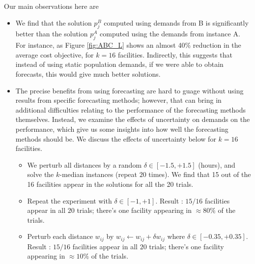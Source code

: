 \noindent
Our main observations here are
\begin{itemize}
\item
We find that the solution $p^B_j$ computed using demands from B is significantly better than the
solution $p^A_j$ computed using the demands from instance A. For instance, as Figure \ref{fig:ABC_L}
shows an almost 40\% reduction in the average cost objective, for $k=16$ facilities.
Indirectly, this suggests that instead of using static population demands, if we were able to obtain 
forecasts, this would give much better solutions.
\item
The precise benefits from using forecasting are hard to guage without using results from specific
forecasting methods; however, that can bring in additional difficulties relating to the performance of the
forecasting methods themselves. Instead, we examine the effects of uncertainty on demands on the
performance, which give us some insights into how well the forecasting methods should be.
We discuss the effects of uncertainty below for $k=16$ facilities.
\begin{itemize}
        \item We perturb all distances by a random $\delta \in [-1.5, +1.5]$ (hours), 
and solve the $k$-median instances (repeat $20$ times). We find that 15 out of the 16 facilities appear
in the solutions for all the 20 trials.

        \item Repeat the experiment with $\delta \in [-1, +1]$. Result : $15/16$ facilities appear in all $20$ trials; there's one facility appearing in $\approx 80\%$ of the trials.

        \item Perturb each distance $w_{ij}$ by $w_{ij} \gets w_{ij} + \delta w_{ij}$ where $\delta \in [-0.35, +0.35]$. Result : $15/16$ facilities appear in all $20$ trials; there's one facility appearing in $\approx 10\%$ of the trials.
\end{itemize}
\end{itemize}



